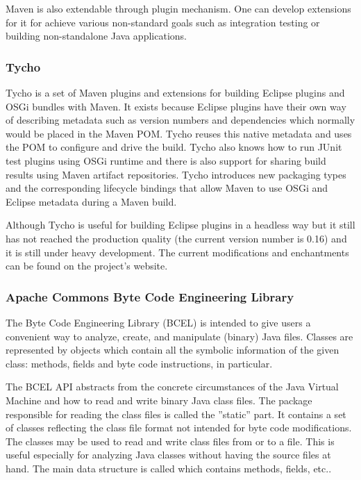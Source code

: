 Maven is also extendable through plugin mechanism. One can develop extensions for it
for achieve various non-standard goals such as integration testing or building 
non-standalone Java applications.

\subsubsection{Tycho}
Tycho is a set of Maven plugins and extensions for building Eclipse plugins and
OSGi bundles with Maven. It exists because Eclipse plugins have their own way of
describing metadata such as version numbers and dependencies which normally
would be placed in the Maven POM. Tycho reuses this native metadata 
and uses the POM to configure and drive the build. Tycho also knows
how to run JUnit test plugins using OSGi runtime and there is also support for
sharing build results using Maven artifact repositories. Tycho introduces
new packaging types and the corresponding lifecycle bindings that allow Maven to
use OSGi and Eclipse metadata during a Maven build.

Although Tycho is useful for building Eclipse plugins in a headless way but it
still has not reached the production quality (the current version number is
0.16) and it is still under heavy development. The current modifications and
enchantments can be found on the project's website.


\subsubsection{Apache Commons Byte Code Engineering Library} 
The Byte Code Engineering Library (BCEL) \cite{BCEL} is intended to give users a
convenient way to analyze, create, and manipulate (binary) Java files. Classes
are represented by objects which contain all the symbolic information of the
given class: methods, fields and byte code instructions, in particular.

The BCEL API abstracts from the concrete circumstances of the Java Virtual
Machine and how to read and write binary Java class files. The package 
responsible for reading the class files is called the ''static'' part.
It contains a set of classes reflecting the class file format not intended for
byte code modifications. The classes may be used to read and write class files
from or to a file. This is useful especially for analyzing Java classes without
having the source files at hand. The main data structure is called
 which contains methods, fields, etc..

